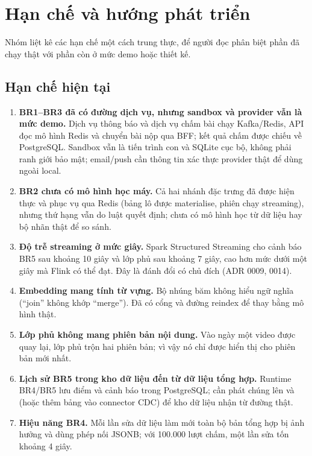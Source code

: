 \chapter{Hạn chế và hướng phát triển}
\label{chap:limits}

Nhóm liệt kê các hạn chế một cách trung thực, để người đọc phân biệt phần đã chạy thật với phần còn ở mức demo hoặc thiết kế.

\section{Hạn chế hiện tại}

\begin{enumerate}
  \item \textbf{BR1--BR3 đã có đường dịch vụ, nhưng sandbox và provider vẫn là mức demo.} Dịch vụ thông báo và dịch vụ chấm bài chạy Kafka/Redis, API đọc mô hình Redis và chuyển bài nộp qua BFF; kết quả chấm được chiếu về PostgreSQL. Sandbox vẫn là tiến trình con và SQLite cục bộ, không phải ranh giới bảo mật; email/push cần thông tin xác thực provider thật để dùng ngoài local.
  \item \textbf{BR2 chưa có mô hình học máy.} Cả hai nhánh đặc trưng đã được hiện thực và phục vụ qua Redis (bảng lô được materialise, phiên chạy streaming), nhưng thứ hạng vẫn do luật quyết định; chưa có mô hình học từ dữ liệu hay bộ nhãn thật để so sánh.
  \item \textbf{Độ trễ streaming ở mức giây.} Spark Structured Streaming cho cảnh báo BR5 sau khoảng 10 giây và lớp phủ sau khoảng 7 giây, cao hơn mức dưới một giây mà Flink có thể đạt. Đây là đánh đổi có chủ đích (ADR 0009, 0014).
  \item \textbf{Embedding mang tính từ vựng.} Bộ nhúng băm không hiểu ngữ nghĩa (``join'' không khớp ``merge''). Đã có cổng  và đường reindex để thay bằng mô hình thật.
  \item \textbf{Lớp phủ không mang phiên bản nội dung.} Vào ngày một video được quay lại, lớp phủ trộn hai phiên bản; vì vậy nó chỉ được hiển thị cho phiên bản mới nhất.
  \item \textbf{Lịch sử BR5 trong kho dữ liệu đến từ dữ liệu tổng hợp.} Runtime BR4/BR5 lưu điểm và cảnh báo trong PostgreSQL; cần phát chúng lên  và  (hoặc thêm bảng vào connector CDC) để kho dữ liệu nhận từ đường thật.
  \item \textbf{Hiệu năng BR4.} Mỗi lần sửa dữ liệu làm mới toàn bộ bản tổng hợp bị ảnh hưởng và dùng phép nối JSONB; với 100.000 lượt chấm, một lần sửa tốn khoảng 4 giây.

\end{enumerate}
